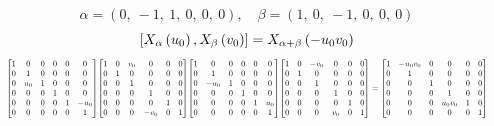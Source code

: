 \documentclass[11pt]{article}
\theoremstyle{definition}
\begin{document}
\[
\alpha = \left( 0, \  -1, \  1, \  0, \  0, \  0\right), \quad \beta = \left( 1, \  0, \  -1, \  0, \  0, \  0\right)
\]
\[
\scaletoalign{\textwidth}{\left[ X_{\alpha}\left(u_{0}\right), X_{\beta}\left(v_{0}\right) \right] = X_{\alpha + \beta}\left(- u_{0} v_{0}\right)}
\]
\[
\scaletoalign{\textwidth}{{\left[\begin{matrix}1 & 0 & 0 & 0 & 0 & 0\\0 & 1 & 0 & 0 & 0 & 0\\0 & u_{0} & 1 & 0 & 0 & 0\\0 & 0 & 0 & 1 & 0 & 0\\0 & 0 & 0 & 0 & 1 & - u_{0}\\0 & 0 & 0 & 0 & 0 & 1\end{matrix}\right]} {\left[\begin{matrix}1 & 0 & v_{0} & 0 & 0 & 0\\0 & 1 & 0 & 0 & 0 & 0\\0 & 0 & 1 & 0 & 0 & 0\\0 & 0 & 0 & 1 & 0 & 0\\0 & 0 & 0 & 0 & 1 & 0\\0 & 0 & 0 & - v_{0} & 0 & 1\end{matrix}\right]} {\left[\begin{matrix}1 & 0 & 0 & 0 & 0 & 0\\0 & 1 & 0 & 0 & 0 & 0\\0 & - u_{0} & 1 & 0 & 0 & 0\\0 & 0 & 0 & 1 & 0 & 0\\0 & 0 & 0 & 0 & 1 & u_{0}\\0 & 0 & 0 & 0 & 0 & 1\end{matrix}\right]} {\left[\begin{matrix}1 & 0 & - v_{0} & 0 & 0 & 0\\0 & 1 & 0 & 0 & 0 & 0\\0 & 0 & 1 & 0 & 0 & 0\\0 & 0 & 0 & 1 & 0 & 0\\0 & 0 & 0 & 0 & 1 & 0\\0 & 0 & 0 & v_{0} & 0 & 1\end{matrix}\right]} = {\left[\begin{matrix}1 & - u_{0} v_{0} & 0 & 0 & 0 & 0\\0 & 1 & 0 & 0 & 0 & 0\\0 & 0 & 1 & 0 & 0 & 0\\0 & 0 & 0 & 1 & 0 & 0\\0 & 0 & 0 & u_{0} v_{0} & 1 & 0\\0 & 0 & 0 & 0 & 0 & 1\end{matrix}\right]}}
\]
\end{document}
